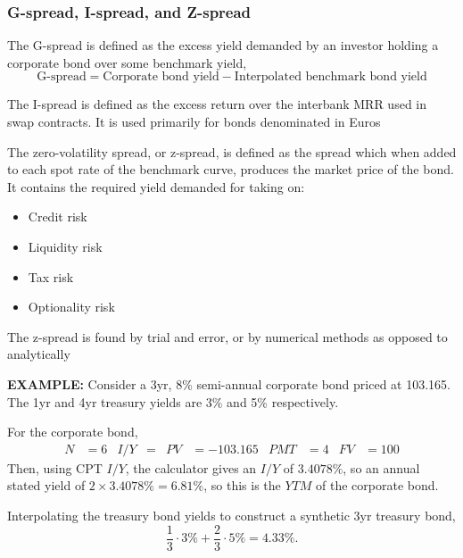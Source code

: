 \documentclass[../notes_compiled.tex]{subfiles}
\begin{document}
\subsubsection{G-spread, I-spread, and Z-spread}
\begin{itemize}
\item The G-spread is defined as the excess yield demanded by an investor holding a corporate bond over some benchmark yield,
\begin{equation}
\text{G-spread} = \text{Corporate bond yield} - \text{Interpolated benchmark bond yield}
\end{equation}
\item The I-spread is defined as the excess return over the interbank MRR used in swap contracts. It is used primarily for bonds denominated in Euros
\item The zero-volatility spread, or z-spread, is defined as the spread which when added to each spot rate of the benchmark curve, produces the market price of the bond. It contains the required yield demanded for taking on:
\begin{multicols}{2}
\begin{itemize}
\item Credit risk \item Liquidity risk \item Tax risk \item Optionality risk
\end{itemize}
\end{multicols}
The z-spread is found by trial and error, or by numerical methods as opposed to analytically
{\color{RedViolet}
\item[] \textbf{EXAMPLE:} Consider a 3yr, 8\% semi-annual corporate bond priced at 103.165. The 1yr and 4yr treasury yields are 3\% and 5\% respectively.
}
{\color{RoyalBlue}
\item[] For the corporate bond,
\begin{align*}
N&=6  & I / Y &=  & PV &=-103.165 & PMT &=4 & FV &= 100
\end{align*}
Then, using CPT $I / Y$, the calculator gives an $I / Y$ of $3.4078\%$, so an annual stated yield of $2\times 3.4078\% = 6.81\%$, so this is the $YTM$ of the corporate bond.

\item[] Interpolating the treasury bond yields to construct a synthetic 3yr treasury bond,
\begin{equation*}
\frac{1}{3}\cdot3\% + \frac{2}{3}\cdot5\% = 4.33\%.
\end{equation*}

}
\end{itemize}
\end{document}

